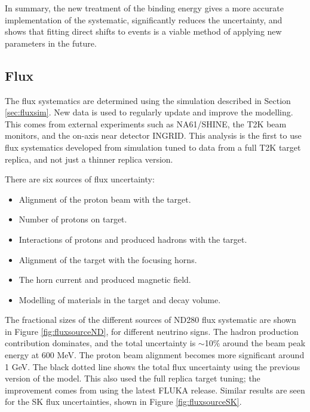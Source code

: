 In summary, the new treatment of the binding energy gives a more accurate implementation of the systematic, significantly reduces the uncertainty, and shows that fitting direct shifts to events is a viable method of applying new parameters in the future.

\subsection{Flux}\label{sec:flux}

The flux systematics are determined using the simulation described in Section \ref{sec:fluxsim}. New data is used to regularly update and improve the modelling. This comes from external experiments such as NA61/SHINE\cite{na61}, the T2K beam monitors, and the on-axis near detector INGRID. This analysis is the first to use flux systematics developed from simulation tuned to data from a full T2K target replica, and not just a thinner replica version.

There are six sources of flux uncertainty:

\begin{itemize}

\item Alignment of the proton beam with the target.

\item Number of protons on target.

\item Interactions of protons and produced hadrons with the target.

\item Alignment of the target with the focusing horns.

\item The horn current and produced magnetic field.

\item Modelling of materials in the target and decay volume.

\end{itemize}

The fractional sizes of the different sources of ND280 flux systematic are shown in Figure \ref{fig:fluxsourceND}, for different neutrino signs. The hadron production contribution dominates, and the total uncertainty is $\sim$10$\%$ around the beam peak energy at 600 MeV. The proton beam alignment becomes more significant around 1 GeV. The black dotted line shows the total flux uncertainty using the previous version of the model. This also used the full replica target tuning; the improvement comes from using the latest FLUKA\cite{fluka} release. Similar results are seen for the SK flux uncertainties, shown in Figure \ref{fig:fluxsourceSK}.

